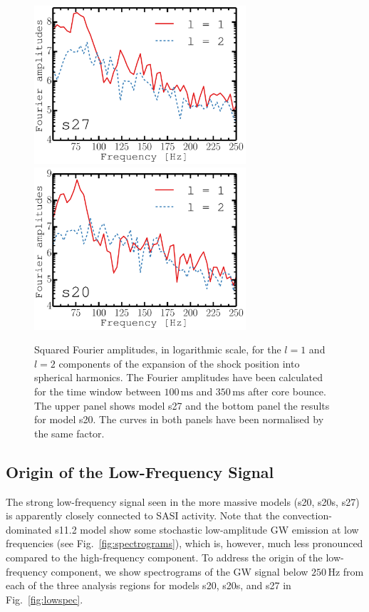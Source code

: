 \begin{figure}
\centering
\includegraphics[width=0.7\textwidth]{./images/paper1/fig13a.pdf}
\\
\includegraphics[width=0.7\textwidth]{./images/paper1/fig13b.pdf}
\caption{Squared Fourier amplitudes, in logarithmic scale, for the $l=1$ and $l=2$ components of the
  expansion of the shock position into spherical harmonics.  The
  Fourier amplitudes have been calculated for the time window between
  $100 \, \mathrm{ms}$ and $350 \, \mathrm{ms}$ after core bounce. 
  The upper panel shows model s27 and the bottom panel the results for model s20.
  The curves in both panels have been normalised by the same factor.
\label{fig:sfreq}}
\end{figure}
  
\subsection{Origin of the Low-Frequency Signal}
\label{sec:lowfreq}
The strong low-frequency signal seen in the more massive models (s20, s20s, s27)
is apparently closely connected to SASI activity.
Note that the convection-dominated s11.2 model show
some stochastic low-amplitude GW emission at low frequencies (see
Fig.~\ref{fig:spectrograms}), which is, however, much less pronounced
compared to the high-frequency component.
To address the origin of
the low-frequency component, we show spectrograms of the GW signal below
$250 \, \mathrm{Hz}$ from each of the three analysis regions for models
s20, s20s, and s27 in Fig.~\ref{fig:lowspec}.

